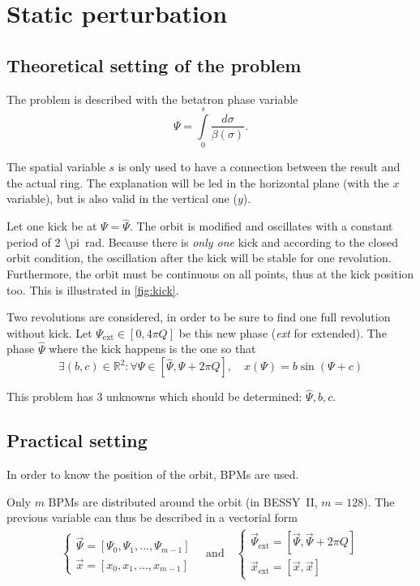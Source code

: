 \section{Static perturbation}
\label{sec:loc_static}

\subsection{Theoretical setting of the problem}
The problem is described with the betatron phase variable 
\begin{equation}
\Psi = \int\limits_{0}^s \frac{d\sigma}{\beta(\sigma)}.
\end{equation}

The spatial variable $s$ is only used to have a connection between the result and the actual ring. The explanation will be led in the horizontal plane (with the $x$ variable), but is also valid in the vertical one ($y$).

Let one kick be at $\Psi = \hat{\Psi}$. The orbit is modified and oscillates with a constant period of \SI{2 \pi}{\radian}. Because there is \emph{only one} kick and according to the closed orbit condition, the oscillation after the kick will be stable for one revolution. Furthermore, the orbit must be continuous on all points, thus at the kick position too. This is illustrated in \cref{fig:kick}.

Two revolutions are considered, in order to be sure to find one full revolution without kick. Let $\Psi_\mathrm{ext} \in [0, 4 \pi Q]$ be this new phase (\textit{ext} for extended). The phase $\hat\Psi$ where the kick happens is the one so that 
\begin{equation}
\exists (b, c) \in \mathbb{R}^2:
\forall \Psi \in [\hat\Psi, \hat\Psi + 2 \pi Q], \quad
x(\Psi) = b \sin(\Psi + c)
\end{equation}

This problem has 3 unknowns which should be determined: $\hat\Psi, b, c$. 

\subsection{Practical setting}
In order to know the position of the orbit, BPMs are used.

Only $m$ BPMs are distributed around the orbit (in BESSY~II, $m=128$). The previous variable can thus be described in a vectorial form
\begin{align}
\begin{cases}
\vec{\Psi} = [\Psi_0, \Psi_1, ..., \Psi_{m-1}] \\
\vec{x} = [x_0, x_1, ..., x_{m-1}]
\end{cases} \quad \mathrm{and} \quad
\begin{cases}
\vec{\Psi}_\mathrm{ext} = [\vec{\Psi}, \vec{\Psi}+2\pi Q ]\\
\vec{x}_\mathrm{ext} = [\vec{x}, \vec{x}]
\end{cases}
\end{align}

